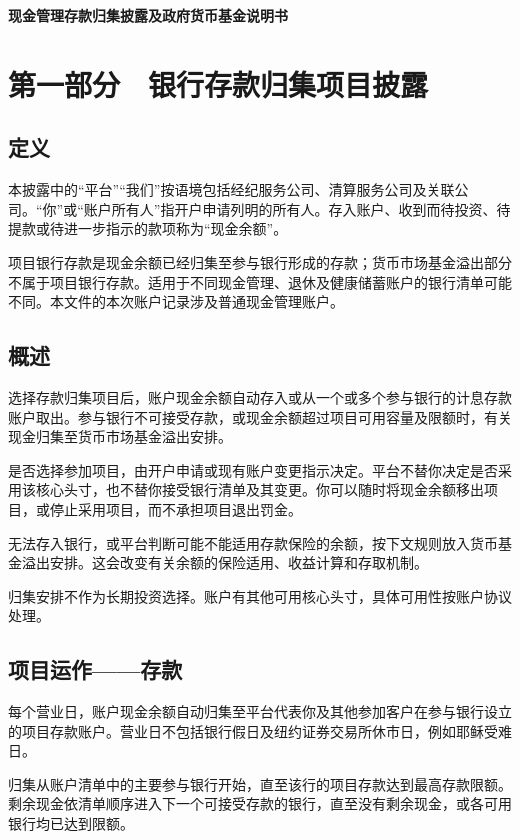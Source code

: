 \documentclass[UTF8,fontset=none,11pt,a4paper]{ctexart}
\begin{document}
{\noindent\LARGE\bfseries 现金管理存款归集披露及政府货币基金说明书\par}
\vspace{10pt}
\section*{第一部分　银行存款归集项目披露}
\subsection*{定义}
本披露中的“平台”“我们”按语境包括经纪服务公司、清算服务公司及关联公司。“你”或“账户所有人”指开户申请列明的所有人。存入账户、收到而待投资、待提款或待进一步指示的款项称为“现金余额”。


项目银行存款是现金余额已经归集至参与银行形成的存款；货币市场基金溢出部分不属于项目银行存款。适用于不同现金管理、退休及健康储蓄账户的银行清单可能不同。本文件的本次账户记录涉及普通现金管理账户。


\subsection*{概述}
选择存款归集项目后，账户现金余额自动存入或从一个或多个参与银行的计息存款账户取出。参与银行不可接受存款，或现金余额超过项目可用容量及限额时，有关现金归集至货币市场基金溢出安排。


是否选择参加项目，由开户申请或现有账户变更指示决定。平台不替你决定是否采用该核心头寸，也不替你接受银行清单及其变更。你可以随时将现金余额移出项目，或停止采用项目，而不承担项目退出罚金。


无法存入银行，或平台判断可能不能适用存款保险的余额，按下文规则放入货币基金溢出安排。这会改变有关余额的保险适用、收益计算和存取机制。


归集安排不作为长期投资选择。账户有其他可用核心头寸，具体可用性按账户协议处理。


\subsection*{项目运作——存款}
每个营业日，账户现金余额自动归集至平台代表你及其他参加客户在参与银行设立的项目存款账户。营业日不包括银行假日及纽约证券交易所休市日，例如耶稣受难日。


归集从账户清单中的主要参与银行开始，直至该行的项目存款达到最高存款限额。剩余现金依清单顺序进入下一个可接受存款的银行，直至没有剩余现金，或各可用银行均已达到限额。
\end{document}
